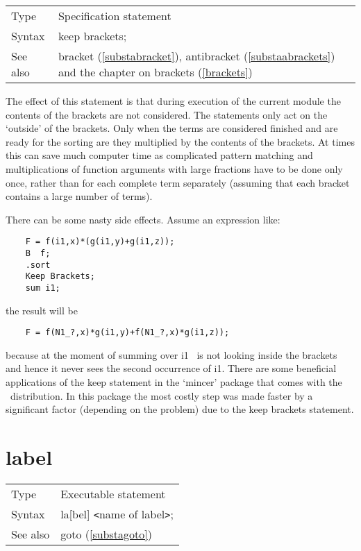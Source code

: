\noindent \begin{tabular}{ll}
Type & Specification statement\\
Syntax & keep brackets; \\
See also & bracket (\ref{substabracket}), antibracket 
     (\ref{substaabrackets}) and the chapter on brackets 
     (\ref{brackets})
\end{tabular} \vspace{4mm}

\noindent The effect 
of this statement is that during execution of the current module the 
contents of the brackets are not considered. The statements only act on the 
`outside' of the brackets. Only when the terms are considered finished and 
are ready for the sorting are they multiplied by the contents of the 
brackets. At times this can save much computer time as complicated pattern 
matching and multiplications of function arguments with large fractions 
have to be done only once, rather than for each complete term separately 
(assuming that each bracket contains a large number of terms).

\noindent There can be some nasty side effects. Assume an expression like:
\begin{verbatim}
    F = f(i1,x)*(g(i1,y)+g(i1,z));
    B  f;
    .sort
    Keep Brackets;
    sum i1;
\end{verbatim}
the result will be
\begin{verbatim}
    F = f(N1_?,x)*g(i1,y)+f(N1_?,x)*g(i1,z));
\end{verbatim}
because at the moment of summing over i1 \FORM\ is not looking inside the 
brackets and hence it never sees the second occurrence of i1. There are 
some beneficial applications of the keep statement in the 
`mincer' package that comes with the \FORM\ distribution. In 
this package the most costly step was made faster by a significant factor 
(depending on the problem) due to the keep brackets statement. 
\vspace{10mm}


\section{label}
\label{substalabel}

\noindent \begin{tabular}{ll}
Type & Executable statement\\
Syntax & la[bel] {\tt<}name of label{\tt>};
\\ See also & goto (\ref{substagoto})
\end{tabular} \vspace{4mm}

